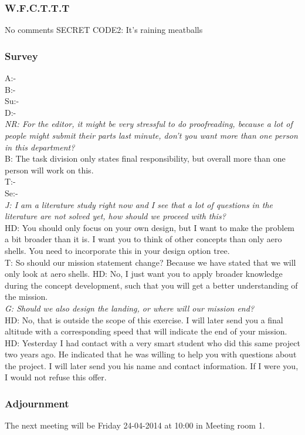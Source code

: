 \subsubsection{W.F.C.T.T.T}
No comments
SECRET CODE2: It's raining meatballs

\subsubsection{Survey}
A:-\\ 
B:-\\
Su:-\\
D:-\\
\textit{NR: For the editor, it might be very stressful to do proofreading, because a lot of people might submit their parts last minute, don't you want more than one person in this department?} \\
B: The task division only states final responsibility, but overall more than one person will work on this.\\
T:-\\
Se:-\\
\textit{J: I am a literature study right now and I see that a lot of questions in the literature are not solved yet, how should we proceed with this?}\\
HD: You should only focus on your own design, but I want to make the problem a bit broader than it is. I want you to think of other concepts than only aero shells. You need to incorporate this in your design option tree.\\
T: So should our mission statement change? Because we have stated that we will only look at aero shells.
HD: No, I just want you to apply broader knowledge during the concept development, such that you will get a better understanding of the mission.\\
\textit{G: Should we also design the landing, or where will our mission end?}\\
HD: No, that is outside the scope of this exercise. I will later send you a final altitude with a corresponding speed that will indicate the end of your mission.\\

HD: Yesterday I had contact with a very smart student who did this same project two years ago. He indicated that he was willing to help you with questions about the project. I will later send you his name and contact information. If I were you, I would not refuse this offer.\\

\subsubsection{Adjournment}
The next meeting will be Friday 24-04-2014 at 10:00 in Meeting room 1.\\

